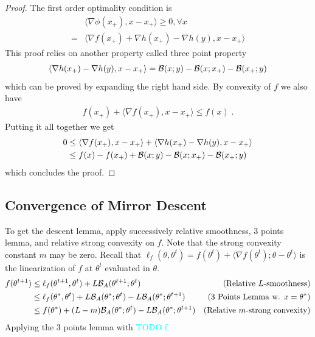 \documentclass{article}
\newcommand{\TODO}[1]{\textcolor{cyan}{TODO #1}}
\newcommand{\logpart}{A}
\newcommand{\bregman}{\cB_\logpart}
\newcommand{\natp}{\theta}
\begin{document}
\begin{proof}
	The first order optimality condition is
	\begin{align}
		&\langle \nabla \phi (x_+) , x -  x_+ \rangle \geq 0, \forall x \\
		=& \langle \nabla f(x_+) + \nabla h(x_+) - \nabla h (y), x - x_+ \rangle  
	\end{align}
	This proof relies on another property called three point property 
	\begin{align}
		\langle \nabla h(x_+) - \nabla h (y), x - x_+ \rangle  ={\mathcal B}(x;y) -{\mathcal B}(x;x_+) - {\mathcal B}(x_+;y) 
	\end{align}
	which can be proved by expanding the right hand side.
	By convexity of $f$ we also have 
	\begin{align}
		 f(x_+) + \langle \nabla f(x_+), x - x_+ \rangle \leq f(x) \; .
	\end{align} 
	Putting it all together we get
	\begin{align}
		0 
		&\leq  \langle \nabla f(x_+), x - x_+ \rangle + \langle \nabla h(x_+) - \nabla h (y), x - x_+ \rangle  \\
		&\leq f(x) - f(x_+) + {\mathcal B}(x;y) -{\mathcal B}(x;x_+) - {\mathcal B}(x_+;y)
	\end{align}
	which concludes the proof.
\end{proof}

\subsection{Convergence of Mirror Descent}
To get the descent lemma, apply successively relative smoothness, 3 points lemma, and relative strong convexity on $f$. Note that the strong convexity constant $m$ may be zero. Recall that $\ell_f(\natp, \natp^{t}) = f(\natp^t) + \langle \nabla f (\natp^t) ; \natp - \natp^t \rangle $ is the linearization of $f$ at $\natp^t$ evaluated in $\natp$. 
\begin{align}
	f(\natp^{t+1}) 
	&\leq \ell_f(\natp^{t+1}, \natp^{t})  + L \bregman(\natp^{t+1}; \natp^{t})
	& \text{(Relative $L$-smoothness)} \\
	& \leq \ell_f(\natp^{*}, \natp^{t})  + L \bregman(\natp^{*}; \natp^{t}) -L \bregman(\natp^{*}; \natp^{t+1}) 
	& \text{(3 Points Lemma w. $x=\natp^*$)} \\
	& \leq f(\natp^*) + (L - m) \bregman(\natp^{*}; \natp^{t}) -L \bregman(\natp^{*}; \natp^{t+1}) 
	& \text{(Relative $m$-strong convexity)}
\end{align}
Applying the 3 points lemma with \TODO{f}
\end{document}
